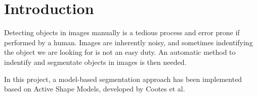 \section{Introduction}
Detecting objects in images manually is a tedious process and
error prone if performed by a human. Images are inherently noisy, and
sometimes indentifying the object we are looking for is not an easy duty.
An automatic method to indentify and segmentate objects in images
is then needed.

In this project, a model-based segmentation approach has been
implemented based on Active Shape Models, developed by Cootes et al.
